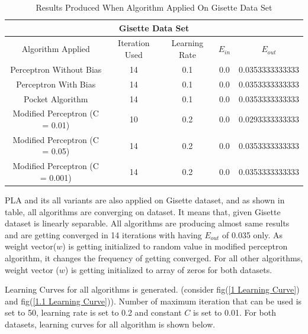 \documentclass{article}
\begin{document}
\begin{table}[H]
\begin{center}
\begin{tabular}{ |c|c|c|c|c| } 
\hline
\multicolumn{5}{|c|}{Gisette Data Set} \\
\hline
\hline
Algorithm Applied & Iteration Used & Learning Rate & \(E_{in}\) & \(E_{out}\) \\
\hline
\hline
{Perceptron Without Bias} & 14 & 0.1 & 0.0 & 0.0353333333333 \\ 

\hline
\hline
Perceptron With Bias & 14 & 0.1 & 0.0 & 0.0353333333333 \\
\hline
\hline
Pocket Algorithm & 14 & 0.1 & 0.0 & 0.0353333333333 \\
\hline
\hline
Modified Perceptron (C = 0.01) & 10 & 0.2 & 0.0 & 0.0293333333333 \\
\hline
\hline
Modified Perceptron (C = 0.05) & 14 & 0.2 & 0.0 & 0.0353333333333 \\
\hline
\hline
Modified Perceptron (C = 0.001) & 14 & 0.2 & 0.0 & 0.0353333333333 \\
\hline
\end{tabular}
\caption{Results Produced When Algorithm Applied On Gisette Data Set}
\end{center}
\end{table}
PLA and its all variants are also applied on Gisette dataset, and as shown in table, all algorithms are converging on dataset. It means that, given Gisette dataset is linearly separable. All algorithms are producing almost same results and are getting converged in 14 iterations with having \(E_{out}\) of 0.035 only. As weight vector(\(w\))  is getting initialized to random value in modified perceptron algorithm, it changes the frequency of getting converged. 
For all other algorithms, weight vector (\(w\))  is getting initialized to array of zeros for both datasets.
\par Learning Curves for all algorithms is generated. (consider fig(\ref{1 Learning Curve}) and fig(\ref{1.1 Learning Curve})). Number of maximum iteration that can be used is set to 50, learning rate is set to 0.2 and constant \(C\) is set to 0.01. For both datasets, learning curves for all algorithm is shown below.
\end{document}

